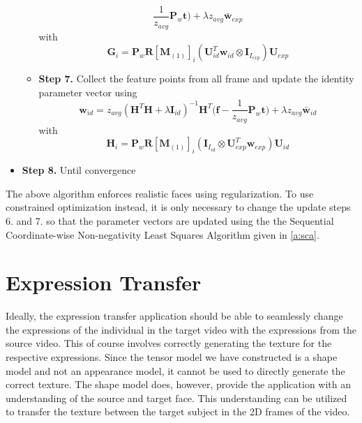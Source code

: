 \documentclass[11pt,a4paper,twoside]{report}
\begin{document}
\begin{itemize}
\begin{itemize}
\begin{equation*}
\frac{1}{z_{avg}}\mathbf{P}_w\mathbf{t}\bigr) + \lambda z_{avg}\mathbf{\bar{w}}_{exp}
\end{equation*}
with 
\begin{equation*}
\mathbf{G}_i =
\mathbf{P}_w\mathbf{R}[\mathbf{M}_{(1)}]_{i}(\mathbf{U}_{id}^T\mathbf{w}_{id}
\otimes \mathbf{I}_{I_{exp}})\mathbf{U}_{exp}
\end{equation*}
\item[\textbullet] \textbf{Step 7.} Collect the feature points from all frame
  and update the identity parameter vector using 
\begin{equation*}
\mathbf{w}_{id} =z_{avg}(\mathbf{H}^T\mathbf{H} + \lambda\mathbf{I}_{id})^{-1}\mathbf{H}^T\bigl(\mathbf{f}
- \frac{1}{z_{avg}}\mathbf{P}_w\mathbf{t}\bigr) + \lambda z_{avg}\mathbf{\bar{w}}_{id}
\end{equation*}
with
\begin{equation*}
\mathbf{H}_i = \mathbf{P}_w\mathbf{R}[\mathbf{M}_{(1)}]_{i}(\mathbf{I}_{I_{id}}
\otimes \mathbf{U}_{exp}^T\mathbf{w}_{exp})\mathbf{U}_{id}
\end{equation*}
\end{itemize}
\item \textbf{Step 8.} Until convergence 
\end{itemize}
The above algorithm enforces realistic faces using
regularization. To use constrained optimization instead, it is only necessary to
change the update steps 6. and 7. so that the parameter vectors are updated using
the the Sequential Coordinate-wise Non-negativity Least Squares Algorithm given
in \ref{a:sca}.

\section{Expression Transfer}\label{s:exptranalgo}
Ideally, the expression transfer application should be able to seamlessly change
the expressions of the individual in the target video with the expressions from
the source video. This of course involves correctly generating the texture for
the respective expressions. Since the tensor model we have constructed is a
shape model and not an appearance model, it cannot be used to directly generate
the correct texture. The shape model does, however, provide the application with an
understanding of the source and target face. This understanding can be utilized
to transfer the texture between the target subject in the 2D frames of the
video.
\end{document}
